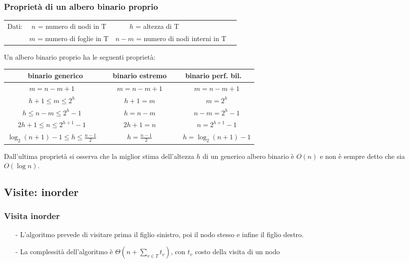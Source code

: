 \documentclass[a4paper]{article}
\begin{document}
\subsubsection*{Proprietà di un albero binario proprio}
\begin{center}
	\begin{tabularx}{\textwidth}{l c c X}
		Dati: &\(n\) = numero di nodi in T & \(h\) = altezza di T \(\qquad\qquad\;\;\) &\\
		& \(m\) = numero di foglie in T & \(n-m\) = numero di nodi interni in T &
	\end{tabularx}
\end{center}
Un albero binario proprio ha le seguenti proprietà:
\begin{center}
	\begin{tabular}{c c c}
		\textbf{binario generico} & \textbf{binario estremo} & \textbf{binario perf. bil.} \\
		\toprule
		\(m = n - m + 1\quad\) & \(\quad m = n - m + 1 \quad\) & \(\quad m = n - m + 1\) \\
		\midrule
		\(h+1 \leq m \leq 2^h\quad\) & \(\quad h+1 = m \quad\) & \(\quad m = 2^h\) \\
		\midrule
		\(h \leq n-m \leq 2^h-1\quad\) & \(\quad h = n-m \quad\) & \(\quad n-m = 2^h-1\) \\
		\midrule
		\(2h + 1 \leq n \leq 2^{h+1}-1\quad\) & \(\quad 2h + 1 = n \quad\) & \(\quad n = 2^{h+1}-1\) \\
		\midrule
		\(\log_2(n + 1)-1 \leq h \leq \frac{n-1}{2}\quad\) & \(\quad h = \frac{n-1}{2} \quad\) & \(\quad h = \log_2(n + 1)-1\) \\
		\bottomrule
	\end{tabular}
\end{center}
Dall'ultima proprietà si osserva che la miglior stima dell'altezza \(h\) di un generico albero binario è \(O(n)\) e non è sempre
detto che sia \(O(\log n)\).

\subsection{Visite: inorder}
\subsubsection*{Visita inorder}
\begin{itemize}[topsep=3pt, itemsep=0pt]
	\item[-] L'algoritmo prevede di visitare prima il figlio sinistro, poi il nodo stesso e infine il figlio destro.
	\item[-] La complessità dell'algoritmo è \(\Theta\left(n + \displaystyle \sum_{v \in T}t_v\right)\), con \(t_v\) costo della visita di un nodo
\end{itemize}
\end{document}
